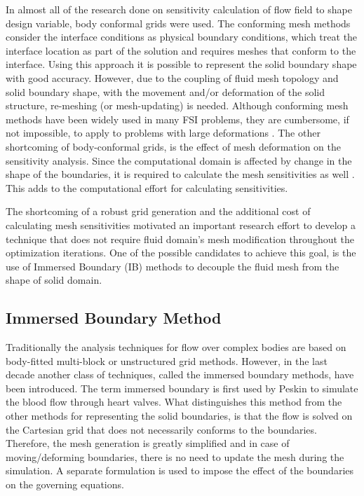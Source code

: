 In almost all of the research done on sensitivity calculation of flow field to shape design variable, body conformal grids were used. The conforming mesh methods consider the interface conditions as physical boundary conditions, which treat the interface location as part of the solution and requires meshes that conform to the interface. Using this approach it is possible to represent the solid boundary shape with good accuracy. However, due to the coupling of fluid mesh topology and solid boundary shape, with the movement and/or deformation of the solid structure, re-meshing (or mesh-updating) is needed. Although conforming mesh methods have been widely used in many FSI problems, they are cumbersome, if not impossible, to apply to problems with large deformations \cite{sahin2009arbitrary}. The other shortcoming of body-conformal grids, is the effect of mesh deformation on the sensitivity analysis. Since the computational domain is affected by change in the shape of the boundaries, it is required to calculate the mesh sensitivities as well \cite{liu2013boundary}. This adds to the computational effort for calculating  sensitivities.

The shortcoming of a robust grid generation and the additional cost of calculating mesh sensitivities motivated an important research effort to develop a technique that does not require fluid domain's mesh modification throughout the optimization iterations. One of the possible candidates to achieve this goal, is the use of Immersed Boundary (IB) methods to decouple the fluid mesh from the shape of solid domain.
\subsection{Immersed Boundary Method}
Traditionally the analysis techniques for flow over complex bodies are based on body-fitted multi-block or unstructured grid methods. However, in the last decade another class of techniques, called the immersed boundary methods, have been introduced. The term immersed boundary is first used by Peskin \cite{peskin1977numerical} to simulate the blood flow through heart valves. What distinguishes this method from the other methods for representing the solid boundaries, is that the flow is solved on the Cartesian grid that does not necessarily conforms to the boundaries. Therefore, the mesh generation is greatly simplified and in case of moving/deforming boundaries, there is no need to update the mesh during the simulation. A separate formulation is used to impose the effect of the boundaries on the governing equations.

